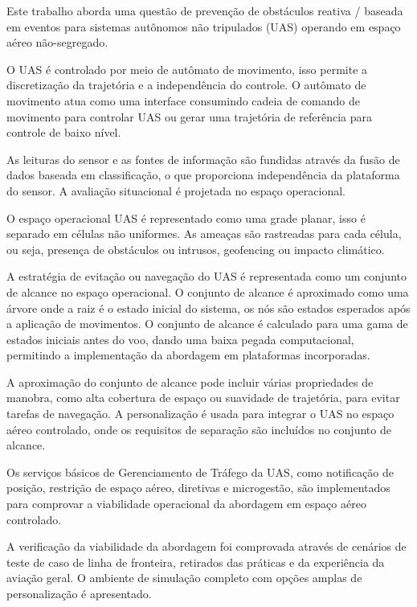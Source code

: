 \noindent Este trabalho aborda uma questão de prevenção de obstáculos reativa / baseada em eventos para sistemas autônomos não tripulados (UAS) operando em espaço aéreo não-segregado.

O UAS é controlado por meio de autômato de movimento, isso permite a discretização da trajetória e a independência do controle. O autômato de movimento atua como uma interface consumindo cadeia de comando de movimento para controlar UAS ou gerar uma trajetória de referência para controle de baixo nível.

As leituras do sensor e as fontes de informação são fundidas através da fusão de dados baseada em classificação, o que proporciona independência da plataforma do sensor. A avaliação situacional é projetada no espaço operacional.

O espaço operacional UAS é representado como uma grade planar, isso é separado em células não uniformes. As ameaças são rastreadas para cada célula, ou seja, presença de obstáculos ou intrusos, geofencing ou impacto climático.

A estratégia de evitação ou navegação do UAS é representada como um conjunto de alcance no espaço operacional. O conjunto de alcance é aproximado como uma árvore onde a raiz é o estado inicial do sistema, os nós são estados esperados após a aplicação de movimentos. O conjunto de alcance é calculado para uma gama de estados iniciais antes do voo, dando uma baixa pegada computacional, permitindo a implementação da abordagem em plataformas incorporadas.

A aproximação do conjunto de alcance pode incluir várias propriedades de manobra, como alta cobertura de espaço ou suavidade de trajetória, para evitar tarefas de navegação. A personalização é usada para integrar o UAS no espaço aéreo controlado, onde os requisitos de separação são incluídos no conjunto de alcance.

Os serviços básicos de Gerenciamento de Tráfego da UAS, como notificação de posição, restrição de espaço aéreo, diretivas e microgestão, são implementados para comprovar a viabilidade operacional da abordagem em espaço aéreo controlado.

A verificação da viabilidade da abordagem foi comprovada através de cenários de teste de caso de linha de fronteira, retirados das práticas e da experiência da aviação geral. O ambiente de simulação completo com opções amplas de personalização é apresentado.